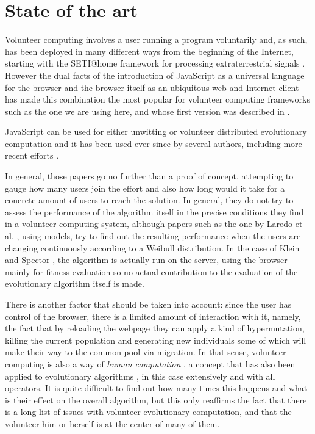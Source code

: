 \documentclass[runningheads,a4paper]{llncs}\usepackage[]{graphicx}\usepackage[]{color}
\begin{document}
\section{State of the art}
\label{sec:soa}

Volunteer computing involves a user running a program voluntarily
and, as such, has been deployed in many different ways from the
beginning of the Internet, starting with the SETI@home framework for
processing extraterrestrial signals \cite{david-seti:home}. However
the dual facts of the introduction of JavaScript as a universal language for the
browser and the browser itself as an ubiquitous web and Internet client has
made this combination the most popular for volunteer computing
frameworks such as the one we are using here, and whose first version
was described in \cite{DBLP:conf/gecco/GuervosG15}.

JavaScript can be used for either unwitting
\cite{unwitting-ec,boldrin2007distributed} or volunteer 
\cite{langdon:2005:metas,gecco07:workshop:dcor} distributed
evolutionary computation and it has been used ever since by several
authors, including more recent efforts
\cite{duda2013distributed,DBLP:journals/corr/abs-0801-1210,EvoStar2014:jsEO}. 

In general, those papers go no further than a proof of concept,
attempting to gauge how many users join the effort and also how long
would it take for a concrete amount of users to reach the solution. In
general, they do not try to assess the performance of the algorithm
itself in the precise conditions they find in a volunteer computing
system, although papers such as the one by Laredo et
al. \cite{churn08:ijhpsa}, using models, try to find out the resulting
performance when the users are changing continuously according to a
Weibull distribution. In the case of Klein and Spector \cite{unwitting-ec}, the algorithm
is actually run on the server, using the browser mainly for fitness
evaluation so no actual contribution to the evaluation of the
evolutionary algorithm itself is made.

There is another factor that should be taken into account: since the
user has control of the browser, there is a limited amount of
interaction with it, namely, the fact that by reloading the webpage they
can apply a kind of hypermutation, killing the current population and
generating new individuals some of which will make their way to the
common pool via migration. In that sense, volunteer computing is also
a way of {\em human computation} \cite{quinn2011human}, a concept that
has also been applied to evolutionary algorithms \cite{972056}, in
this case extensively and with all operators. It is quite difficult to
find out how many times this happens and what is their effect on the
overall algorithm, but this only reaffirms the fact that there is a
long list of issues with volunteer evolutionary computation, and that
the volunteer him or herself is at the center of many of them.
\end{document}
